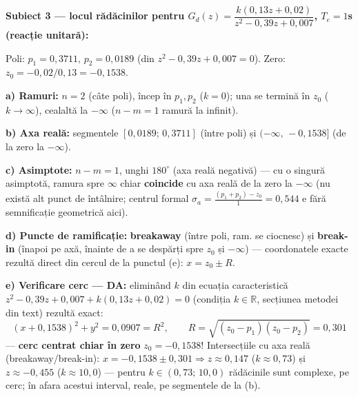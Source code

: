 \documentclass[10pt,a4paper]{article}
\begin{document}
\begin{keyeq}\color{red!65!black}
\textbf{Subiect 3 — locul rădăcinilor pentru $G_d(z)=\dfrac{k(0{,}13z+0{,}02)}{z^2-0{,}39z+0{,}007}$, $T_e{=}1$s (reacție unitară):}

Poli: $p_1{=}0{,}3711,\,p_2{=}0{,}0189$ (din $z^2{-}0{,}39z{+}0{,}007{=}0$). Zero: $z_0{=}{-}0{,}02/0{,}13{=}{-}0{,}1538$.

\textbf{a) Ramuri:} $n{=}2$ (câte poli), încep în $p_1,p_2$ ($k{=}0$); una se termină în $z_0$ ($k\to\infty$), cealaltă la $-\infty$ ($n{-}m{=}1$ ramură la infinit).

\textbf{b) Axa reală:} segmentele $[0{,}0189;\,0{,}3711]$ (între poli) și $(-\infty,\,-0{,}1538]$ (de la zero la $-\infty$).

\textbf{c) Asimptote:} $n{-}m{=}1$, unghi $180^\circ$ (axa reală negativă) — cu o singură asimptotă, ramura spre $\infty$ chiar \textbf{coincide} cu axa reală de la zero la $-\infty$ (nu există alt punct de întâlnire; centrul formal $\sigma_a{=}\frac{(p_1+p_2)-z_0}{1}{=}0{,}544$ e fără semnificație geometrică aici).

\textbf{d) Puncte de ramificație:} \textbf{breakaway} (între poli, ram. se ciocnesc) și \textbf{break-in} (înapoi pe axă, înainte de a se despărți spre $z_0$ și $-\infty$) — coordonatele exacte rezultă direct din cercul de la punctul (e): $x{=}z_0\pm R$.

\textbf{e) Verificare cerc — DA:} eliminând $k$ din ecuația caracteristică $z^2{-}0{,}39z{+}0{,}007{+}k(0{,}13z{+}0{,}02){=}0$ (condiția $k\in\mathbb R$, secțiunea metodei din text) rezultă exact:
$$(x+0{,}1538)^2+y^2=0{,}0907=R^2,\qquad R=\sqrt{(z_0{-}p_1)(z_0{-}p_2)}=0{,}301$$
— \textbf{cerc centrat chiar în zero} $z_0{=}{-}0{,}1538$! Intersecțiile cu axa reală (breakaway/break-in): $x{=}{-}0{,}1538\pm0{,}301\Rightarrow z{\approx}0{,}147$ ($k{\approx}0{,}73$) și $z{\approx}{-}0{,}455$ ($k{\approx}10{,}0$) — pentru $k\in(0{,}73;\,10{,}0)$ rădăcinile sunt complexe, pe cerc; în afara acestui interval, reale, pe segmentele de la (b).
\end{keyeq}

\begin{center}
\end{center}
\end{document}

